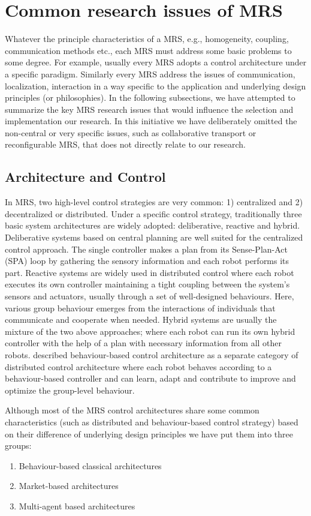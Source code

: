 \section*{Common research issues of MRS}
Whatever the principle characteristics of a MRS, e.g., homogeneity, coupling, communication methods etc., each MRS  must address some basic problems to some degree. For example, usually every MRS adopts a control architecture under a specific paradigm. Similarly every MRS address the issues of communication, localization, interaction in a way specific to the application and underlying design principles (or philosophies).  In the following subsections, we have attempted to summarize the key MRS research issues that would influence the selection and implementation our research. In this initiative we have deliberately omitted the non-central or very specific issues, such as collaborative transport or reconfigurable MRS, that does not directly relate to our research.   


\subsection{Architecture and Control}
In MRS, two high-level control strategies are very common: 1) centralized and 2) decentralized or distributed. Under a specific control strategy, traditionally three basic system architectures are widely adopted: deliberative, reactive and hybrid. Deliberative systems based on central planning are well suited for the centralized control approach. The single controller makes a plan from its Sense-Plan-Act (SPA) loop by gathering the sensory information and each robot performs its part. Reactive systems are widely used in distributed control where each robot executes its own controller maintaining a tight coupling between the system's sensors and actuators, usually through a set of well-designed behaviours. Here, various group behaviour emerges from the interactions of individuals that communicate and cooperate when needed. Hybrid systems are usually the mixture of the two above approaches; where each robot can run its own hybrid controller with the help of a plan with necessary information from all other robots. \cite{Mataric2007} described behaviour-based control architecture as a separate category of distributed control architecture  where each robot behaves according to a behaviour-based controller and can learn, adapt and contribute to improve and optimize the group-level behaviour. 

Although most of the MRS control architectures share some common characteristics (such as distributed and behaviour-based control strategy) based on their difference of underlying design principles we have put them into three groups:
\begin{enumerate}
\item Behaviour-based classical architectures
\item Market-based architectures
\item Multi-agent based architectures
\end{enumerate}

